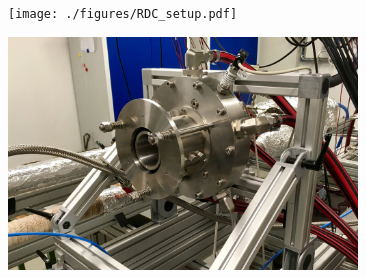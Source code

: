 \documentclass[]{aiaa-tc}%
\begin{document}
\begin{figure}[hb]
\noindent\begin{minipage}[c]{0.48\textwidth}%
		\centering
		\texttt{[image: ./figures/RDC\_setup.pdf]}
		\label{fig:exp_setup}
\end{minipage}\hfill
\begin{minipage}[c]{0.48\textwidth}%
		\centering
		\includegraphics[width=0.825\textwidth]{./figures/test_stand_crop.jpg}
		\label{fig:facility}
\end{minipage}
\end{figure}
\end{document}
